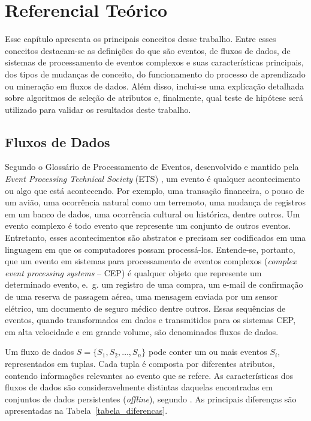 \chapter{Referencial Teórico}\label{chp:referencial}

Esse capítulo apresenta os principais conceitos desse trabalho. Entre esses conceitos destacam-se as definições do que são eventos, de fluxos de dados, de sistemas de processamento de eventos complexos e suas características principais, dos tipos de mudanças de conceito, do funcionamento do processo de aprendizado ou mineração em fluxos de dados. Além disso, inclui-se uma explicação detalhada sobre algoritmos de seleção de atributos e, finalmente, qual teste de hipótese será utilizado para validar os resultados deste trabalho.

\section{Fluxos de Dados}\label{sec:fluxos_dados}

Segundo o Glossário de Processamento de Eventos, desenvolvido e mantido pela \textit{Event Processing Technical Society} (ETS) 
\cite{Luckham2008}, um evento é qualquer acontecimento ou algo que está acontecendo. Por exemplo, uma transação financeira, o pouso de um avião, uma ocorrência natural como um terremoto, uma mudança de registros em um banco de dados, uma ocorrência cultural ou histórica, dentre outros. Um evento complexo é todo evento que represente um conjunto de outros eventos. Entretanto, esses acontecimentos são abstratos e precisam ser codificados em uma linguagem em que os computadores possam processá-los. Entende-se, portanto, que um evento em sistemas para processamento de eventos complexos (\textit{complex event processing systems} -- CEP)
é qualquer objeto que represente um determinado evento, e.~g. um registro de uma compra, um e-mail de confirmação de uma reserva de passagem aérea, uma mensagem enviada por um sensor elétrico, um documento de seguro médico dentre outros. Essas sequências de eventos, quando transformados em dados e transmitidos para os sistemas CEP, em alta velocidade e em grande volume, são denominados fluxos de dados. 

Um fluxo de dados $S = \{S_1, S_2, \ldots, S_n\}$ pode conter um ou mais eventos $S_i$, representados em tuplas. Cada tupla é composta por diferentes atributos, contendo informações relevantes ao evento que se refere. As características dos fluxos de dados são consideravelmente distintas daquelas encontradas em conjuntos de dados persistentes (\textit{offline}), segundo . As principais diferenças são apresentadas na Tabela~\ref{tabela_diferencas}.

